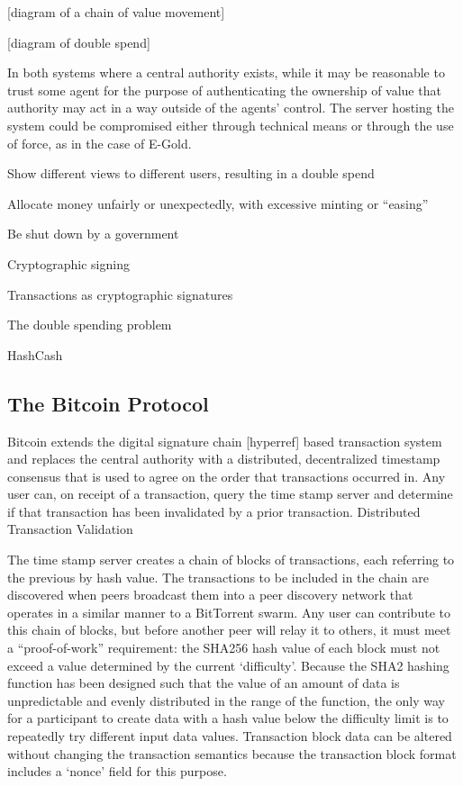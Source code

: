 [diagram of a chain of value movement]

[diagram of double spend]

In both systems where a central authority exists, while it may be reasonable to trust some agent for the purpose of authenticating the ownership of value that authority may act in a way outside of the agents’ control.  The server hosting the system could be compromised either through technical means or through the use of force, as in the case of E-Gold.

    Show different views to different users, resulting in a double spend

    Allocate money unfairly or unexpectedly, with excessive minting or “easing”

    Be shut down by a government


    Cryptographic signing

    Transactions as cryptographic signatures

    The double spending problem

    HashCash

\subsection{The Bitcoin Protocol}
Bitcoin extends the digital signature chain [hyperref] based transaction system and replaces the central authority with a distributed, decentralized timestamp consensus that is used to agree on the order that transactions occurred in.  Any user can, on receipt of a transaction, query the time stamp server and determine if that transaction has been invalidated by a prior transaction.
Distributed Transaction Validation

The time stamp server creates a chain of blocks of transactions, each referring to the previous by hash value.  The transactions to be included in the chain are discovered when peers broadcast them into a peer discovery network that operates in a similar manner to a BitTorrent swarm.  Any user can contribute to this chain of blocks, but before another peer will relay it to others, it must meet a “proof-of-work” requirement: the SHA256 hash value of each block must not exceed a value determined by the current ‘difficulty’.  Because the SHA2 hashing function has been designed such that the value of an amount of data is unpredictable and evenly distributed in the range of the function, the only way for a participant to create data with a hash value below the difficulty limit is to repeatedly try different input data values. Transaction block data can be altered without changing the transaction semantics because the transaction block format includes a ‘nonce’ field for this purpose.

